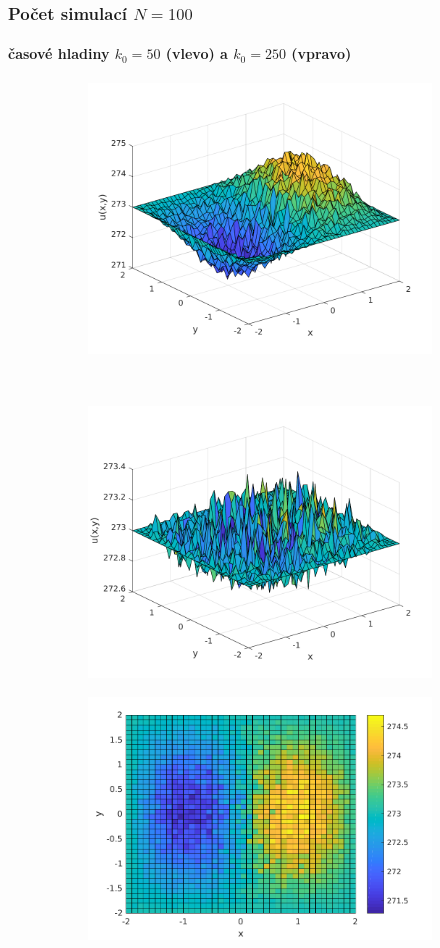 \begin{frame}\frametitle{Počet simulací $N=100$}
\framesubtitle{časové hladiny $k_{0}=50$ (vlevo) a $k_{0}=250$ (vpravo)}
\begin{figure}
    \centering
    \begin{subfigure}[t]{0.5\textwidth}
        \centering
        \includegraphics[width=0.75\linewidth]{../../results/simulations/100/solution_3D/solution_3D_sim100_step01_time50_boundary2.pdf}
    \end{subfigure}%
    ~ 
    \begin{subfigure}[t]{0.5\textwidth}
        \centering
        \includegraphics[width=0.75\linewidth]{../../results/simulations/100/solution_3D/solution_3D_sim100_step01_time250_boundary2.pdf}
    \end{subfigure}
    \begin{subfigure}[t]{0.5\textwidth}
        \centering
        \includegraphics[width=0.775\linewidth]{../../results/simulations/100/solution_2D/solution_2D_sim100_step01_time50_boundary2.pdf}

\end{subfigure}
\end{figure}
\end{frame}
